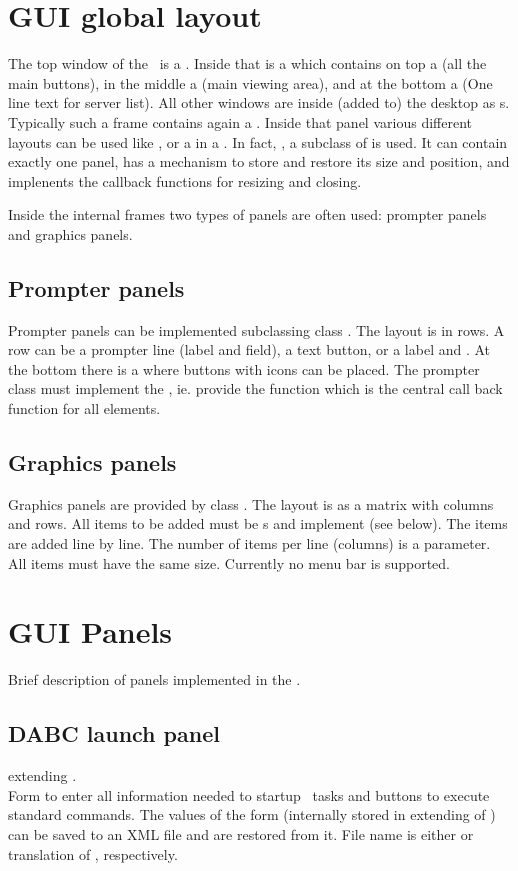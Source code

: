 \section{GUI global layout}
The top window of the \gui\ is a . Inside that is a 
which contains on top a  (all the main buttons), 
in the middle a  (main viewing area), and at the bottom
a  (One line text for server list). 
All other windows are inside (added to) the desktop as s.
Typically such a frame contains again a . Inside that panel various
different layouts can be used like , or a  in a .
In fact, , a subclass of  is used.
It can contain exactly one panel, has a mechanism to store and restore its size and position,
and implenents the callback functions for resizing and closing.

Inside the internal frames two types of panels are often used: prompter panels and
graphics panels.
\subsection{Prompter panels}
Prompter panels can be implemented subclassing class .
The layout is in rows. A row can be a prompter line (label and  field),
a text button, or a label and . At the bottom there is a 
where buttons with icons can be placed. The prompter class must implement the 
, ie. provide the  function which is
the central call back function for all elements.
\subsection{Graphics panels}
Graphics panels are provided by class .
The layout is as a matrix with columns and rows. All items to be added 
must be s and implement  (see below).
The items are added line by line. The number of items per line (columns)
is a parameter. All items must have the same size.
Currently no menu bar is supported.
\section{GUI Panels}
Brief description of panels implemented in the \gui.
\subsection{DABC launch panel}
 extending .\\
Form to enter all information needed to startup \dabc\ tasks and
buttons to execute standard commands.
The values of the form (internally stored in  extending of )
can be saved to an XML file and are restored from it. File name is either
 or translation of , respectively.
